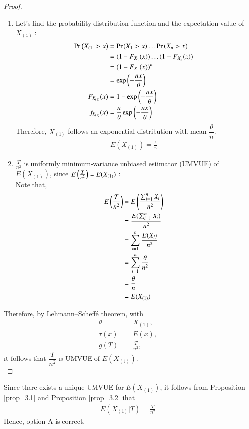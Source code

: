 \documentclass[journal,12pt,twocolumn]{IEEEtran}
\begin{document}
\begin{proof}
\begin{enumerate}
\item Let's find the probability distribution function and the expectation value of $X_{(1)}$ : 
\begin{align}
\Pr\left(X_{(1)} > x\right) &= \Pr\left(X_1 > x\right)\ldots \Pr\left(X_n > x\right)\\
&= (1-F_{X_{1}}(x))\ldots(1-F_{X_{n}}(x))\\
&= (1-F_{X_{1}}(x))^n \\
&= \exp\left(-\frac{nx}{\theta}\right)\\
F_{X_{(1)}}(x) &= 1 - \exp\left(-\frac{nx}{\theta}\right)\\
f_{X_{(1)}}(x) &= \frac{n}{\theta} \exp\left(-\frac{nx}{\theta}\right)
\end{align}
Therefore, $X_{(1)}$ follows an exponential distribution with mean $\dfrac{\theta}{n}$.
\begin{align}
E(X_{(1)}) = \frac{\theta}{n}
\end{align}
\item $\frac{T}{n^2}$ is uniformly minimum-variance unbiased estimator (UMVUE) of $E(X_{(1)})$, since $E\left(\frac{T}{n^2}\right) = E(X_{(1)})$ : \\
Note that,
\begin{align}
E\left(\frac{T}{n^2}\right) &= E\left(\frac{\sum_{i=1}^n X_i}{n^2}\right)\\
&= \frac{E(\sum_{i=1}^n X_i)}{n^2}\\
&= \sum_{i=1}^n \frac{E(X_i)}{n^2}\\
&= \sum_{i=1}^n \frac{\theta}{n^2}\\
&= \frac{\theta}{n}\\
&= E(X_{(1)})
\end{align}
\end{enumerate}
Therefore, by Lehmann–Scheffé theorem, with
\begin{align}
\theta &= X_{(1)},\\
\tau(x) &= E(x),\\
g(T) &= \frac{T}{n^2},
\end{align}
it follows that $\dfrac{T}{n^2}$ is UMVUE of $E(X_{(1)})$.\\
\end{proof}
Since there exists a unique UMVUE for $E(X_{(1)})$, it follows from Proposition \ref{prop_3.1} and Proposition \ref{prop_3.2} that 
\begin{align}
E(X_{(1)} | T) = \frac{T}{n^2} 
\end{align}
Hence, option A is correct.
\end{document}
